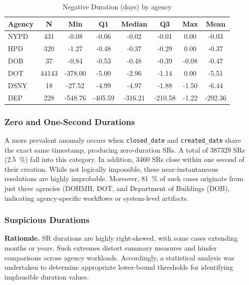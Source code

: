\documentclass[linenumber]{jdsart}
\newcommand{\numint}[1]{\num[round-mode=none]{#1}}
\begin{document}
\begin{table}[tbp]
\centering
\caption{Negative Duration (days) by agency}
\label{tab:negative-days-agency}
\begin{tabular}{l
  S[table-format=5.0, round-mode=places, round-precision=0]
  S[table-format=3.2]
  S[table-format=3.2]
  S[table-format=3.2]
  S[table-format=3.2]
  S[table-format=3.2]
  S[table-format=3.2]}
\toprule
\textbf{Agency} &
\textbf{N} &
\textbf{Min} &
\textbf{Q1} &
\textbf{Median} &
\textbf{Q3} &
\textbf{Max} &
\textbf{Mean} \\
\midrule
NYPD  & 431   & -0.08  & -0.06  & -0.02  & -0.01  & 0.00   & -0.03 \\
HPD   & 320   & -1.27  & -0.48  & -0.37  & -0.29  & 0.00   & -0.37 \\
DOB   & 37    & -0.84  & -0.53  & -0.48  & -0.39  & -0.08  & -0.47 \\
DOT   & 44143 & -378.00 & -5.00 & -2.96 & -1.14 & 0.00 & -5.51 \\
DSNY  & 18    & -27.52 & -4.99 & -4.97 & -1.88 & -1.50 & -6.44 \\
DEP   & 228   & -548.76 & -405.59 & -316.21 & -210.58 & -1.22 & -292.36 \\
\bottomrule
\end{tabular}
\end{table}

\subsubsection{Zero and One-Second Durations}
\label{subsubsec:zerodurations}
A more prevalent anomaly occurs when \texttt{closed\_date} and
\texttt{created\_date} share the exact same timestamp, producing zero-duration
SRs. A total of \numint{387329} SRs (\SI[round-precision = 2]{2.5}{\percent}) fall
into this category. In addition, \numint{3460} SRs close within one second of their
creation. While not logically impossible, these near-instantaneous resolutions
are highly improbable. Moreover, \SI[round-precision = 0]{81}{\percent} 
of such cases originate
from just three agencies (DOHMH, DOT, and Department of Buildings (DOB), 
indicating agency-specific workflows or system-level artifacts.

\subsubsection{Suspicious Durations}
\label{subsubsec:suspiciousdurations}
\textbf{Rationale.}
SR durations are highly right-skewed, with some cases extending months or
years. Such extremes distort summary measures and hinder comparisons across
agency workloads. Accordingly, a statistical analysis was undertaken to 
determine appropriate lower-bound thresholds for identifying implausible 
duration values.
\end{document}

